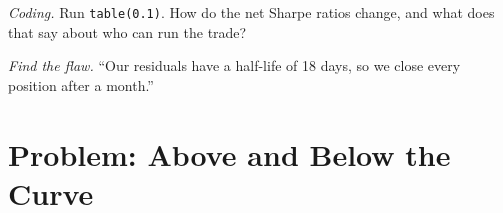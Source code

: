 \begin{exercise}[$\star\star\star$]\label{exo:s2:government-bond-relative-value:7}
\emph{Coding.} Run \texttt{table(0.1)}. How do the net Sharpe ratios change, and what does that say about who can run the trade?
\end{exercise}

\begin{exercise}[$\star\star\star$]\label{exo:s2:government-bond-relative-value:8}
\emph{Find the flaw.} ``Our residuals have a half-life of 18 days, so we close every position after a month.''
\end{exercise}

\section{Problem: Above and Below the Curve}

